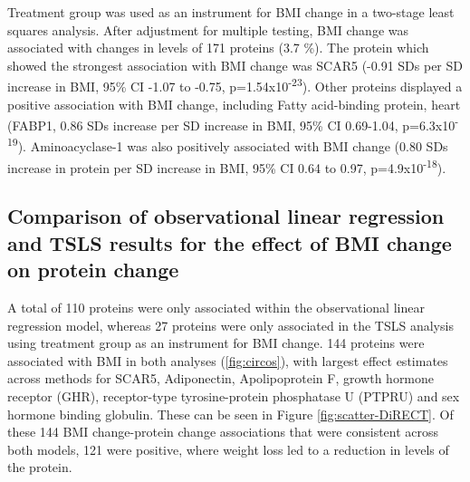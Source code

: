 \documentclass[11pt,twoside]{bristolthesis}
\begin{document}
Treatment group was used as an instrument for BMI change in a two-stage least squares analysis. After adjustment for multiple testing, BMI change was associated with changes in levels of 171 proteins (3.7 \%). The protein which showed the strongest association with BMI change was SCAR5 (-0.91 SDs per SD increase in BMI, 95\% CI -1.07 to -0.75, p=1.54x10\textsuperscript{-23}). Other proteins displayed a positive association with BMI change, including Fatty acid-binding protein, heart (FABP1, 0.86 SDs increase per SD increase in BMI, 95\% CI 0.69-1.04, p=6.3x10\textsuperscript{-19}). Aminoacyclase-1 was also positively associated with BMI change (0.80 SDs increase in protein per SD increase in BMI, 95\% CI 0.64 to 0.97, p=4.9x10\textsuperscript{-18}).

\hypertarget{comparison-of-observational-linear-regression-and-tsls-results-for-the-effect-of-bmi-change-on-protein-change}{%
\subsection{Comparison of observational linear regression and TSLS results for the effect of BMI change on protein change}\label{comparison-of-observational-linear-regression-and-tsls-results-for-the-effect-of-bmi-change-on-protein-change}}

A total of 110 proteins were only associated within the observational linear regression model, whereas 27 proteins were only associated in the TSLS analysis using treatment group as an instrument for BMI change. 144 proteins were associated with BMI in both analyses (\ref{fig:circos}), with largest effect estimates across methods for SCAR5, Adiponectin, Apolipoprotein F, growth hormone receptor (GHR), receptor-type tyrosine-protein phosphatase U (PTPRU) and sex hormone binding globulin. These can be seen in Figure \ref{fig:scatter-DiRECT}. Of these 144 BMI change-protein change associations that were consistent across both models, 121 were positive, where weight loss led to a reduction in levels of the protein.
\end{document}
